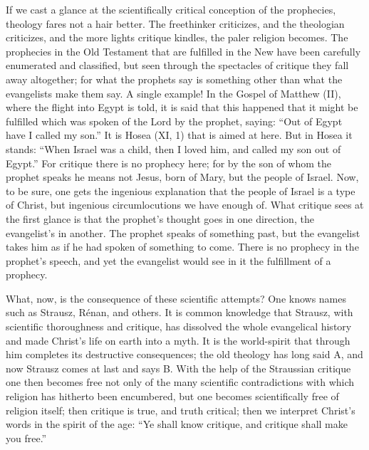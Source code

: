 \documentclass[12pt]{book}
\newcommand{\opage}[1]{\marginnote{\footnotesize\textit{[#1]}}}
\begin{document}
If we cast a glance at the scientifically critical conception of the
prophecies, theology fares not a hair better. The freethinker
criticizes, and the theologian criticizes, and the more lights critique
kindles, the paler religion becomes. The prophecies in the Old Testament
that are fulfilled in the New have been carefully enumerated and
classified, but seen through the spectacles of critique they fall away
altogether; for what the prophets say is something other than what the
evangelists make them say. A single example! In the Gospel of Matthew
(II), where the flight into Egypt is told, it is said that this happened
that it might be fulfilled which was spoken of the Lord by the prophet,
saying: ``Out of Egypt have I called my son.'' It is Hosea (XI, 1) that
is aimed at here. But in Hosea it stands: ``When Israel was a child,
then I loved him, and called my son out of Egypt.'' For critique there
is no prophecy here; for by the son of whom the prophet speaks he means
not Jesus, born of Mary, but the people of Israel. Now, to be sure, one
gets the ingenious explanation that the people of Israel is a type of
Christ, but ingenious circumlocutions we have enough of. What critique
sees at the first glance is that the prophet's thought goes in one
direction, the evangelist's in another. The prophet speaks of something
past, but
\opage{88}\setcounter{footnote}{0}%
the evangelist takes him as if he had spoken of something to come. There
is no prophecy in the prophet's speech, and yet the evangelist would see
in it the fulfillment of a prophecy.

What, now, is the consequence of these scientific attempts? One knows
names such as Strausz, Rénan, and others.
It is common knowledge that Strausz, with scientific thoroughness and
critique, has dissolved the whole evangelical history and made Christ's
life on earth into a myth. It is the world-spirit that through him
completes its destructive consequences; the old theology has long said
A, and now Strausz comes at last and says B. With the help of the
Straussian critique one then becomes free not only of the many
scientific contradictions with which religion has hitherto been
encumbered, but one becomes scientifically free of religion itself; then
critique is true, and truth critical; then we interpret Christ's words
in the spirit of the age: ``Ye shall know critique, and critique shall
make you free.''
\end{document}
